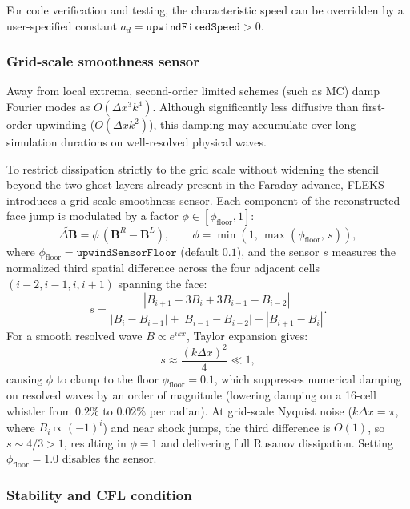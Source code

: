 \documentclass[a4paper, 11pt]{article}
\begin{document}
For code verification and testing, the characteristic speed can be overridden by a user-specified constant $a_d = \texttt{upwindFixedSpeed} > 0$.

\subsubsection{Grid-scale smoothness sensor}

Away from local extrema, second-order limited schemes (such as MC) damp Fourier modes as $O(\Delta x^3 k^4)$. Although significantly less diffusive than first-order upwinding ($O(\Delta x k^2)$), this damping may accumulate over long simulation durations on well-resolved physical waves.

To restrict dissipation strictly to the grid scale without widening the stencil beyond the two ghost layers already present in the Faraday advance, FLEKS introduces a grid-scale smoothness sensor. Each component of the reconstructed face jump is modulated by a factor $\phi \in [\phi_{\text{floor}}, 1]$:
\begin{equation}
\widetilde{\Delta\mathbf{B}} = \phi\,\left(\mathbf{B}^R - \mathbf{B}^L\right), \qquad \phi = \min\left(1,\, \max\left(\phi_{\text{floor}},\, s\right)\right),
\end{equation}
where $\phi_{\text{floor}} = \texttt{upwindSensorFloor}$ (default $0.1$), and the sensor $s$ measures the normalized third spatial difference across the four adjacent cells $(i-2, i-1, i, i+1)$ spanning the face:
\begin{equation}
s = \frac{|B_{i+1} - 3B_i + 3B_{i-1} - B_{i-2}|}{|B_i - B_{i-1}| + |B_{i-1} - B_{i-2}| + |B_{i+1} - B_i|}.
\end{equation}
For a smooth resolved wave $B \propto e^{ikx}$, Taylor expansion gives:
\begin{equation}
s \approx \frac{(k\Delta x)^2}{4} \ll 1,
\end{equation}
causing $\phi$ to clamp to the floor $\phi_{\text{floor}} = 0.1$, which suppresses numerical damping on resolved waves by an order of magnitude (lowering damping on a 16-cell whistler from $0.2\%$ to $0.02\%$ per radian). At grid-scale Nyquist noise ($k\Delta x = \pi$, where $B_i \propto (-1)^i$) and near shock jumps, the third difference is $O(1)$, so $s \sim 4/3 > 1$, resulting in $\phi = 1$ and delivering full Rusanov dissipation. Setting $\phi_{\text{floor}} = 1.0$ disables the sensor.

\subsubsection{Stability and CFL condition}
\end{document}
